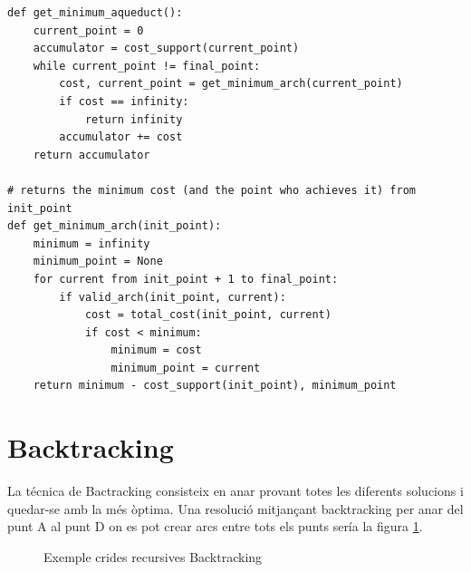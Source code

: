 \documentclass[12pt, letterpaper]{article}
\begin{document}
\begin{verbatim}
def get_minimum_aqueduct():
    current_point = 0
    accumulator = cost_support(current_point)
    while current_point != final_point:
        cost, current_point = get_minimum_arch(current_point)
        if cost == infinity:
            return infinity
        accumulator += cost
    return accumulator

# returns the minimum cost (and the point who achieves it) from init_point
def get_minimum_arch(init_point):
    minimum = infinity 
    minimum_point = None
    for current from init_point + 1 to final_point:
        if valid_arch(init_point, current):
            cost = total_cost(init_point, current)
            if cost < minimum:
                minimum = cost
                minimum_point = current
    return minimum - cost_support(init_point), minimum_point

\end{verbatim}

\newpage
    
\section{Backtracking}
La técnica de Bactracking consisteix en anar provant totes les diferents solucions i quedar-se amb la més òptima. Una
resolució mitjançant backtracking per anar del punt A al punt D on es pot crear arcs entre tots els punts sería la figura \ref{exemple:backtracking}.

\begin{figure}[htbp]
\begin{center}
\caption{Exemple crides recursives Backtracking}
\label{exemple:backtracking}
\end{center}
\end{figure}
\end{document}
